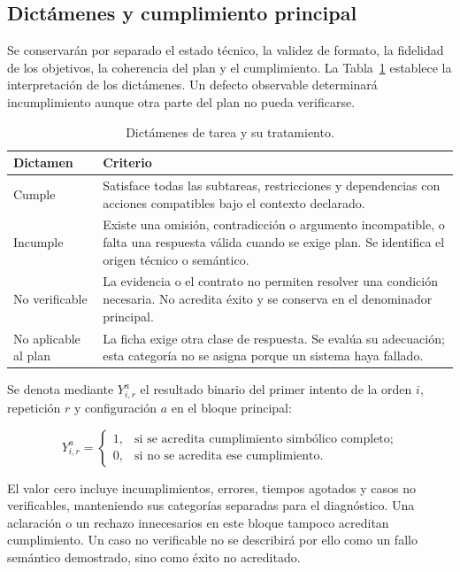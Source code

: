 \subsection{Dictámenes y cumplimiento principal}
\label{sec:planificacion_cap6}

Se conservarán por separado el estado técnico, la validez de formato,
la fidelidad de los objetivos, la coherencia del plan y el cumplimiento.
La Tabla~\ref{tab:dictamenes_cap6} establece la interpretación de los
dictámenes. Un defecto observable determinará incumplimiento aunque
otra parte del plan no pueda verificarse.

\begin{table}[htbp]
\centering
\small
\caption{Dictámenes de tarea y su tratamiento.}
\label{tab:dictamenes_cap6}
\begin{tabularx}{\textwidth}{@{}p{}X@{}}
\toprule
\textbf{Dictamen} & \textbf{Criterio} \\
\midrule
Cumple & Satisface todas las subtareas, restricciones y dependencias con acciones compatibles bajo el contexto declarado. \\
Incumple & Existe una omisión, contradicción o argumento incompatible, o falta una respuesta válida cuando se exige plan. Se identifica el origen técnico o semántico. \\
No verificable & La evidencia o el contrato no permiten resolver una condición necesaria. No acredita éxito y se conserva en el denominador principal. \\
No aplicable al plan & La ficha exige otra clase de respuesta. Se evalúa su adecuación; esta categoría no se asigna porque un sistema haya fallado. \\
\bottomrule
\end{tabularx}
\end{table}

Se denota mediante $Y_{i,r}^{a}$ el resultado binario del primer intento
de la orden $i$, repetición $r$ y configuración $a$ en el bloque principal:

\begin{equation}
Y_{i,r}^{a}=\begin{cases}
1, & \text{si se acredita cumplimiento simbólico completo;}\\
0, & \text{si no se acredita ese cumplimiento.}
\end{cases}
\end{equation}

El valor cero incluye incumplimientos, errores, tiempos agotados y casos
no verificables, manteniendo sus categorías separadas para el diagnóstico.
Una aclaración o un rechazo innecesarios en este bloque tampoco acreditan
cumplimiento. Un caso no verificable no se describirá por ello como un
fallo semántico demostrado, sino como éxito no acreditado.

